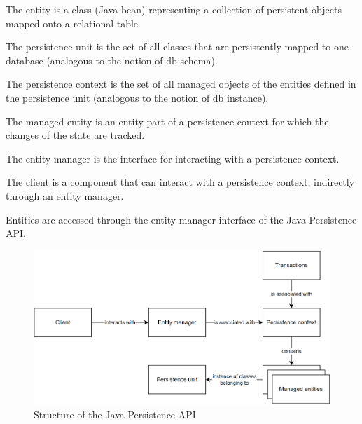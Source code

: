 \begin{definition}
    The entity is a class (Java bean) representing a collection of persistent objects mapped onto a relational table. 
\end{definition}
\begin{definition}
    The persistence unit is the set of all classes that are persistently mapped to one database (analogous to the notion of db schema). 
\end{definition}
\begin{definition}
    The persistence context is the set of all managed objects of the entities defined in the persistence unit (analogous to the notion of db instance). 
\end{definition}
\begin{definition}
    The managed entity is an entity part of a persistence context for which the changes of the state are tracked. 
\end{definition}
\begin{definition}
    The entity manager is the interface for interacting with a persistence context. 
\end{definition}
\begin{definition}    
    The client is a component that can interact with a persistence context, indirectly through an entity manager.
\end{definition}
Entities are accessed through the entity manager interface of the Java Persistence API.
\begin{figure}[H]
    \centering
    \includegraphics[width=0.75\linewidth]{images/jpa.png}
    \caption{Structure of the Java Persistence API}
\end{figure}


